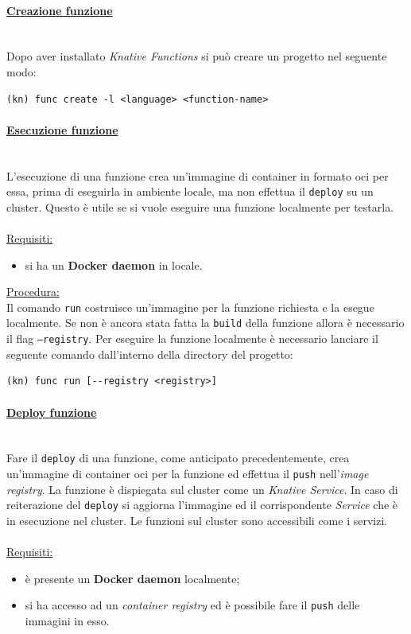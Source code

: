 \documentclass[12pt,a4paper,openany,twoside]{book}
\begin{document}
\paragraph{\underline{Creazione funzione}} ~\\
Dopo aver installato \textit{Knative Functions} si può creare un progetto nel seguente modo:
\begin{lstlisting}
(kn) func create -l <language> <function-name>\end{lstlisting}

\paragraph{\underline{Esecuzione funzione}} ~\\
L'esecuzione di una funzione crea un'immagine di container in formato \ac{oci} per essa, prima di eseguirla in ambiente locale, ma non effettua il \texttt{deploy} su un cluster. Questo è utile se si vuole eseguire una funzione localmente per testarla.
\\ \\
\underline{Requisiti:}
\begin{itemize}
    \item si ha un \textbf{Docker daemon} in locale.
\end{itemize}

\noindent
\underline{Procedura:}
\\
Il comando \texttt{run} costruisce un'immagine per la funzione richiesta e la esegue localmente. Se non è ancora stata fatta la \texttt{build} della funzione allora è necessario il flag \texttt{--registry}.
Per eseguire la funzione localmente è necessario lanciare il seguente comando dall'interno della directory del progetto:
\begin{lstlisting}
(kn) func run [--registry <registry>]\end{lstlisting}


\paragraph{\underline{Deploy funzione}} ~\\
Fare il \texttt{deploy} di una funzione, come anticipato precedentemente, crea un'immagine di container \ac{oci} per la funzione ed effettua il \texttt{push} nell'\textit{image registry}. La funzione è dispiegata sul cluster come un \textit{Knative Service}.
In caso di reiterazione del \texttt{deploy} si aggiorna l'immagine ed il corrispondente \textit{Service} che è in esecuzione nel cluster. Le funzioni sul cluster sono accessibili come i servizi.
\\ \\
\underline{Requisiti:}
\begin{itemize}
    \item è presente un \textbf{Docker daemon} localmente;
    
    \item si ha accesso ad un \textit{container registry} ed è possibile fare il \texttt{push} delle immagini in esso.
\end{itemize}
\end{document}
